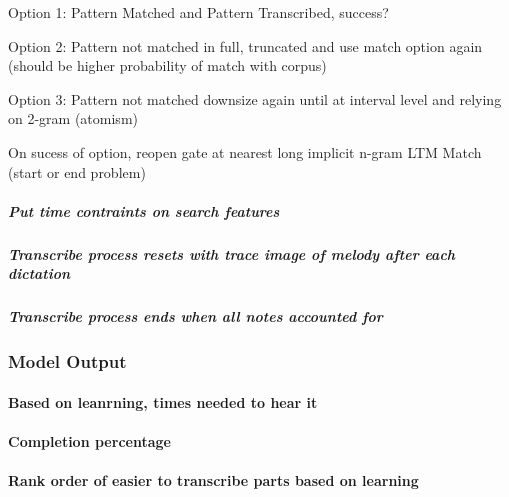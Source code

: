 \documentclass[]{book}
\let\oldparagraph\paragraph
\renewcommand{\paragraph}[1]{\oldparagraph{#1}\mbox{}}
\let\oldsubparagraph\subparagraph
\renewcommand{\subparagraph}[1]{\oldsubparagraph{#1}\mbox{}}
\theoremstyle{definition}
\theoremstyle{definition}
\theoremstyle{definition}
\theoremstyle{remark}
\begin{document}
Option 1: Pattern Matched and Pattern Transcribed, success?

Option 2: Pattern not matched in full, truncated and use match option
again (should be higher probability of match with corpus)

Option 3: Pattern not matched downsize again until at interval level and
relying on 2-gram (atomism)

On sucess of option, reopen gate at nearest long implicit n-gram LTM
Match (start or end problem)

\hypertarget{put-time-contraints-on-search-features}{%
\subparagraph{Put time contraints on search
features}\label{put-time-contraints-on-search-features}}

\hypertarget{transcribe-process-resets-with-trace-image-of-melody-after-each-dictation}{%
\subparagraph{Transcribe process resets with trace image of melody after
each
dictation}\label{transcribe-process-resets-with-trace-image-of-melody-after-each-dictation}}

\hypertarget{transcribe-process-ends-when-all-notes-accounted-for}{%
\subparagraph{Transcribe process ends when all notes accounted
for}\label{transcribe-process-ends-when-all-notes-accounted-for}}

\hypertarget{model-output}{%
\subsubsection{Model Output}\label{model-output}}

\hypertarget{based-on-leanrning-times-needed-to-hear-it}{%
\paragraph{Based on leanrning, times needed to hear
it}\label{based-on-leanrning-times-needed-to-hear-it}}

\hypertarget{completion-percentage}{%
\paragraph{Completion percentage}\label{completion-percentage}}

\hypertarget{rank-order-of-easier-to-transcribe-parts-based-on-learning}{%
\paragraph{Rank order of easier to transcribe parts based on
learning}\label{rank-order-of-easier-to-transcribe-parts-based-on-learning}}
\end{document}
